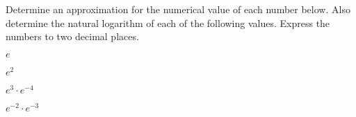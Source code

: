 
\begin{problem}
\item Determine an approximation for the numerical value of each
  number below. Also determine the natural logarithm of each of the
  following values. Express the numbers to two decimal places.
  \begin{subproblem}
  \item $e$
    \vfill
  \item $e^2$
    \vfill
  \item $e^3\cdot e^{-4}$
    \vfill
  \item $e^{-2}\cdot e^{-3}$
    \vfill
  \end{subproblem}
\end{problem}


